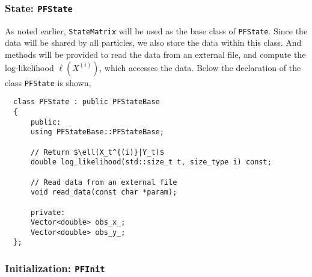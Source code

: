 \subsubsection{State: \texttt{PFState}}

As noted earlier, \verb|StateMatrix| will be used as the base class of
\verb|PFState|. Since the data will be shared by all particles, we also store
the data within this class. And methods will be provided to read the data from
an external file, and compute the log-likelihood $\ell(X^{(i)})$, which
accesses the data. Below the declaration of the class \verb|PFState| is shown,
\begin{Verbatim}
  class PFState : public PFStateBase
  {
      public:
      using PFStateBase::PFStateBase;

      // Return $\ell(X_t^{(i)}|Y_t)$
      double log_likelihood(std::size_t t, size_type i) const;

      // Read data from an external file
      void read_data(const char *param);

      private:
      Vector<double> obs_x_;
      Vector<double> obs_y_;
  };
\end{Verbatim}

\subsubsection{Initialization: \texttt{PFInit}}

